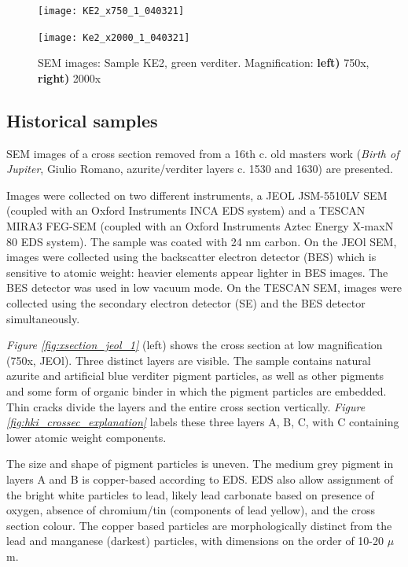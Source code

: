 \begin{figure}[H]
\centering
\begin{minipage}{.45\textwidth}
  \centering
  \texttt{[image: KE2\_x750\_1\_040321]}
\end{minipage}
\begin{minipage}{.45\textwidth}
  \centering
  \texttt{[image: Ke2\_x2000\_1\_040321]}
\end{minipage}
\caption[SEM images: Sample KE2, green verditer]{SEM images: Sample KE2, green verditer. Magnification: \textbf{left)} 750x, \textbf{right)} 2000x}
\label{fig:KE2_sem_1}
\end{figure}


\subsection[Historical samples]{Historical samples}
\label{subsection3.1.3}

SEM images of a cross section removed from a 16th c. old masters work (\textit{Birth of Jupiter}, Giulio Romano, azurite/verditer layers c. 1530 and 1630) are presented.

Images were collected on two different instruments, a JEOL JSM-5510LV SEM (coupled with an Oxford Instruments INCA EDS system) and a TESCAN MIRA3 FEG-SEM (coupled with an Oxford Instruments Aztec Energy X-maxN 80 EDS system). The sample was coated with 24 nm carbon. On the JEOl SEM, images were collected using the backscatter electron detector (BES) which is sensitive to atomic weight: heavier elements appear lighter in BES images. The BES detector was used in low vacuum mode. On the TESCAN SEM, images were collected using the secondary electron detector (SE) and the BES detector simultaneously. 

\textit{Figure \ref{fig:xsection_jeol_1}} (left) shows the cross section at low magnification (750x, JEOl). Three distinct layers are visible. The sample contains natural azurite and artificial blue verditer pigment particles, as well as other pigments and some form of organic binder in which the pigment particles are embedded. Thin cracks divide the layers and the entire cross section vertically. \textit{Figure \ref{fig:hki_crossec_explanation}} labels these three layers A, B, C, with C containing lower atomic weight components. 

The size and shape of pigment particles is uneven. The medium grey pigment in layers A and B is copper-based according to EDS. EDS also allow assignment of the bright white particles to lead, likely lead carbonate based on presence of oxygen, absence of chromium/tin (components of lead yellow), and the cross section colour. The copper based particles are morphologically distinct from the lead and manganese (darkest) particles, with dimensions on the order of 10-20 $\mu$m.

